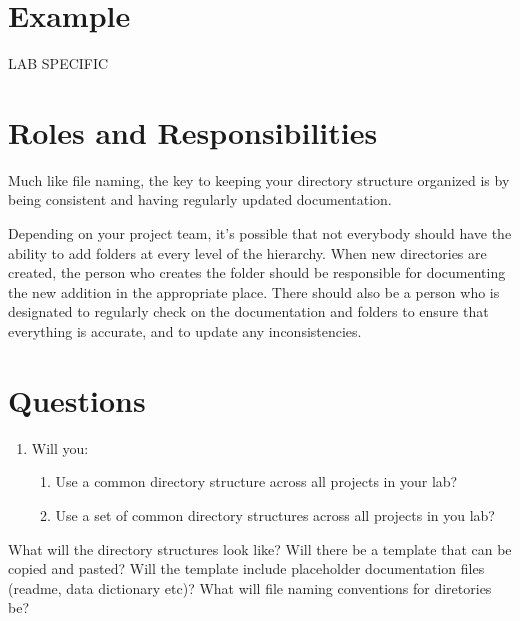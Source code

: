 \documentclass[
]{book}
\providecommand{\tightlist}{%
  \setlength{\itemsep}{0pt}\setlength{\parskip}{0pt}}
\begin{document}
\hypertarget{example}{%
\section*{Example}\label{example}}

LAB SPECIFIC

\hypertarget{roles-and-responsibilities-1}{%
\section*{Roles and Responsibilities}\label{roles-and-responsibilities-1}}

Much like file naming, the key to keeping your directory structure organized is by being consistent and having regularly updated documentation.

Depending on your project team, it's possible that not everybody should have the ability to add folders at every level of the hierarchy. When new directories are created, the person who creates the folder should be responsible for documenting the new addition in the appropriate place. There should also be a person who is designated to regularly check on the documentation and folders to ensure that everything is accurate, and to update any inconsistencies.

\hypertarget{questions-2}{%
\section*{Questions}\label{questions-2}}

\begin{enumerate}
\def\labelenumi{\arabic{enumi}.}
\tightlist
\item
  Will you:

  \begin{enumerate}
  \def\labelenumii{\alph{enumii}.}
  \tightlist
  \item
    Use a common directory structure across all projects in your lab?
  \item
    Use a set of common directory structures across all projects in you lab?
  \end{enumerate}
\end{enumerate}

What will the directory structures look like? Will there be a template that can be copied and pasted? Will the template include placeholder documentation files (readme, data dictionary etc)?
What will file naming conventions for diretories be?
\end{document}
